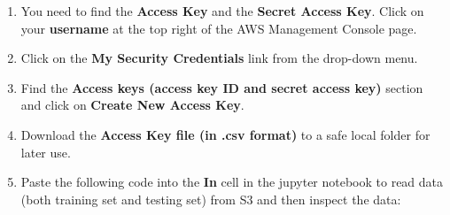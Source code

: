 \documentclass[]{book}
\providecommand{\tightlist}{%
  \setlength{\itemsep}{0pt}\setlength{\parskip}{0pt}}
\begin{document}
\begin{enumerate}
\def\labelenumi{\arabic{enumi}.}
\setcounter{enumi}{94}
\tightlist
\item
  You need to find the \textbf{Access Key} and the \textbf{Secret Access Key}. Click on your \textbf{username} at the top right of the AWS Management Console page.
\item
  Click on the \textbf{My Security Credentials} link from the drop-down menu.
\item
  Find the \textbf{Access keys (access key ID and secret access key)} section and click on \textbf{Create New Access Key}.
\item
  Download the \textbf{Access Key file (in .csv format)} to a safe local folder for later use.
\item
  Paste the following code into the \textbf{In} cell in the jupyter notebook to read data (both training set and testing set) from S3 and then inspect the data:
\end{enumerate}
\end{document}
